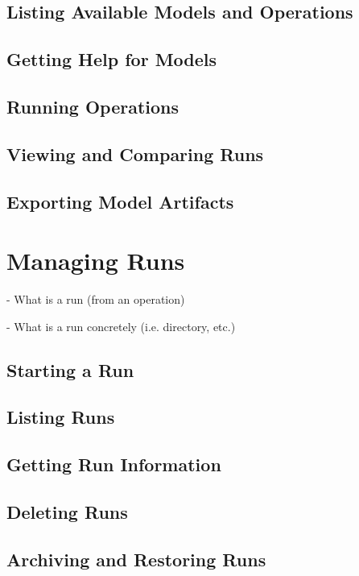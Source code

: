 \documentclass{article}
\begin{document}
\subsection{Listing Available Models and Operations}

\subsection{Getting Help for Models}

\subsection{Running Operations}

\subsection{Viewing and Comparing Runs}

\subsection{Exporting Model Artifacts}

\section{Managing Runs}
\label{sec:runs}

- What is a run (from an operation)

- What is a run concretely (i.e. directory, etc.)

\subsection{Starting a Run}

\subsection{Listing Runs}

\subsection{Getting Run Information}

\subsection{Deleting Runs}

\subsection{Archiving and Restoring Runs}
\end{document}
